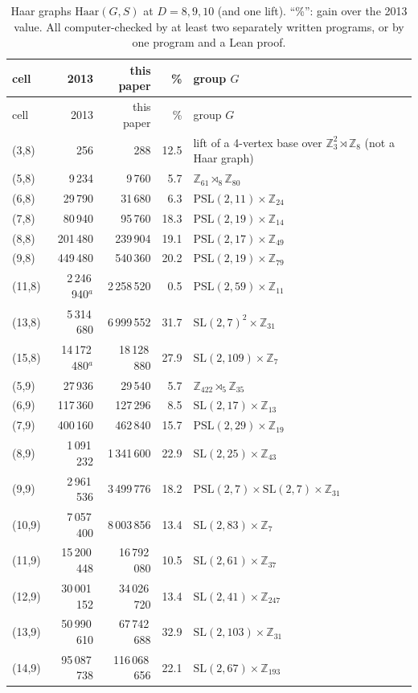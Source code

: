 \documentclass[11pt]{amsart}
\theoremstyle{definition}
\theoremstyle{remark}
\numberwithin{equation}{section}
\newcommand{\Z}{\mathbb Z}
\newcommand{\SL}{\mathrm{SL}}
\newcommand{\PSL}{\mathrm{PSL}}
\begin{document}
\begin{longtable}{@{}l r r r p{6.3cm}@{}}
\caption{Haar graphs $\mathrm{Haar}(G,S)$ at $D=8,9,10$ (and one lift). ``\%'': gain over the 2013 value. All computer-checked by at
least two separately written programs, or by one program and a Lean proof.}\label{tab:haar}\\
\toprule cell & 2013 & this paper & \% & group $G$ \\ \midrule\endfirsthead
\toprule cell & 2013 & this paper & \% & group $G$ \\ \midrule\endhead
\bottomrule\endfoot
(3,8) & 256 & 288 & 12.5 & lift of a 4-vertex base over $\Z_3^2\rtimes\Z_8$ (not a Haar graph)\\
(5,8) & 9\,234 & 9\,760 & 5.7 & $\Z_{61}\rtimes_8\Z_{80}$\\
(6,8) & 29\,790 & 31\,680 & 6.3 & $\PSL(2,11)\times\Z_{24}$\\
(7,8) & 80\,940 & 95\,760 & 18.3 & $\PSL(2,19)\times\Z_{14}$\\
(8,8) & 201\,480 & 239\,904 & 19.1 & $\PSL(2,17)\times\Z_{49}$\\
(9,8) & 449\,480 & 540\,360 & 20.2 & $\PSL(2,19)\times\Z_{79}$\\
(11,8) & 2\,246\,940$^a$ & 2\,258\,520 & 0.5 & $\PSL(2,59)\times\Z_{11}$\\
(13,8) & 5\,314\,680 & 6\,999\,552 & 31.7 & $\SL(2,7)^2\times\Z_{31}$\\
(15,8) & 14\,172\,480$^a$ & 18\,128\,880 & 27.9 & $\SL(2,109)\times\Z_7$\\
(5,9) & 27\,936 & 29\,540 & 5.7 & $\Z_{422}\rtimes_5\Z_{35}$\\
(6,9) & 117\,360 & 127\,296 & 8.5 & $\SL(2,17)\times\Z_{13}$\\
(7,9) & 400\,160 & 462\,840 & 15.7 & $\PSL(2,29)\times\Z_{19}$\\
(8,9) & 1\,091\,232 & 1\,341\,600 & 22.9 & $\SL(2,25)\times\Z_{43}$\\
(9,9) & 2\,961\,536 & 3\,499\,776 & 18.2 & $\PSL(2,7)\times\SL(2,7)\times\Z_{31}$\\
(10,9) & 7\,057\,400 & 8\,003\,856 & 13.4 & $\SL(2,83)\times\Z_7$\\
(11,9) & 15\,200\,448 & 16\,792\,080 & 10.5 & $\SL(2,61)\times\Z_{37}$\\
(12,9) & 30\,001\,152 & 34\,026\,720 & 13.4 & $\SL(2,41)\times\Z_{247}$\\
(13,9) & 50\,990\,610 & 67\,742\,688 & 32.9 & $\SL(2,103)\times\Z_{31}$\\
(14,9) & 95\,087\,738 & 116\,068\,656 & 22.1 & $\SL(2,67)\times\Z_{193}$\\

\end{longtable}
\end{document}
